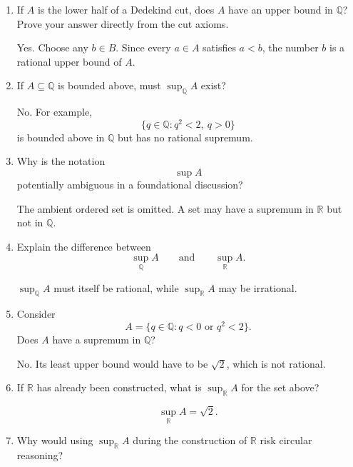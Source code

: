 \documentclass{essay}
\begin{document}
\begin{enumerate}[label=\arabic*., itemsep=10pt]
\item If $A$ is the lower half of a Dedekind cut, does $A$ have an upper bound in $\mathbb{Q}$?
Prove your answer directly from the cut axioms.

\begin{answer}
Yes. Choose any $b\in B$. Since every $a\in A$ satisfies $a<b$, the number $b$ is a rational upper bound of $A$.
\end{answer}

\item If $A\subseteq\mathbb{Q}$ is bounded above, must $\sup_{\mathbb{Q}}A$ exist?

\begin{answer}
No. For example,
\[
\{q\in\mathbb{Q}:q^2<2,\ q>0\}
\]
is bounded above in $\mathbb{Q}$ but has no rational supremum.
\end{answer}

\item Why is the notation
\[
\sup A
\]
potentially ambiguous in a foundational discussion?

\begin{answer}
The ambient ordered set is omitted. A set may have a supremum in $\mathbb{R}$ but not in $\mathbb{Q}$.
\end{answer}

\item Explain the difference between
\[
\sup_{\mathbb{Q}}A
\qquad\text{and}\qquad
\sup_{\mathbb{R}}A.
\]

\begin{answer}
$\sup_{\mathbb{Q}}A$ must itself be rational, while $\sup_{\mathbb{R}}A$ may be irrational.
\end{answer}

\item Consider
\[
A=\{q\in\mathbb{Q}:q<0\text{ or }q^2<2\}.
\]
Does $A$ have a supremum in $\mathbb{Q}$?

\begin{answer}
No. Its least upper bound would have to be $\sqrt2$, which is not rational.
\end{answer}

\item If $\mathbb{R}$ has already been constructed, what is $\sup_{\mathbb{R}}A$ for the set above?

\begin{answer}
\[
\sup_{\mathbb{R}}A=\sqrt2.
\]
\end{answer}

\item Why would using $\sup_{\mathbb{R}}A$ during the construction of $\mathbb{R}$ risk circular reasoning?


\end{enumerate}
\end{document}
